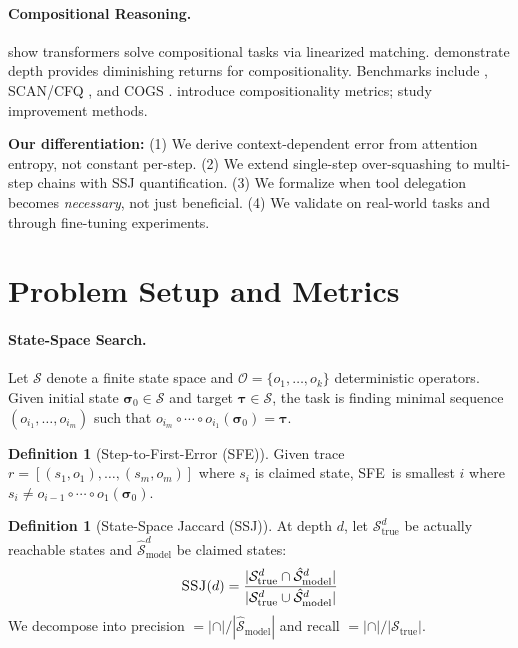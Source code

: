 \documentclass{article}
\theoremstyle{plain}
\theoremstyle{definition}
\newtheorem{definition}[theorem]{Definition}
\theoremstyle{remark}
\newcommand{\state}{\boldsymbol{\sigma}}
\newcommand{\target}{\boldsymbol{\tau}}
\newcommand{\ops}{\mathcal{O}}
\newcommand{\sfe}{\textsc{SFE}}
\newcommand{\ssj}{\textsc{SSJ}}
\begin{document}
\paragraph{Compositional Reasoning.} \citet{dziri2024faith} show transformers solve compositional tasks via linearized matching. \citet{petty2024depth} demonstrate depth provides diminishing returns for compositionality. Benchmarks include \citet{lake2018generalization}, SCAN/CFQ \citep{keysers2020measuring}, and COGS \citep{kim2020cogs}. \citet{press2023measuring} introduce compositionality metrics; \citet{ontanon2022making} study improvement methods.

\textbf{Our differentiation:} (1) We derive context-dependent error from attention entropy, not constant per-step. (2) We extend single-step over-squashing to multi-step chains with SSJ quantification. (3) We formalize when tool delegation becomes \emph{necessary}, not just beneficial. (4) We validate on real-world tasks and through fine-tuning experiments.


\section{Problem Setup and Metrics}
\label{sec:prelim}

\paragraph{State-Space Search.} Let $\mathcal{S}$ denote a finite state space and $\ops = \{o_1, \ldots, o_k\}$ deterministic operators. Given initial state $\state_0 \in \mathcal{S}$ and target $\target \in \mathcal{S}$, the task is finding minimal sequence $(o_{i_1}, \ldots, o_{i_m})$ such that $o_{i_m} \circ \cdots \circ o_{i_1}(\state_0) = \target$.

\begin{definition}[Step-to-First-Error (\sfe)]
Given trace $r = [(s_1, o_1), \ldots, (s_m, o_m)]$ where $s_i$ is claimed state, \sfe\ is smallest $i$ where $s_i \neq o_{i-1} \circ \cdots \circ o_1(\state_0)$.
\end{definition}

\begin{definition}[State-Space Jaccard (\ssj)]
\label{def:ssj}
At depth $d$, let $\mathcal{S}_\text{true}^d$ be actually reachable states and $\hat{\mathcal{S}}_\text{model}^d$ be claimed states:
\begin{equation}
\ssj(d) = \frac{|\mathcal{S}_\text{true}^d \cap \hat{\mathcal{S}}_\text{model}^d|}{|\mathcal{S}_\text{true}^d \cup \hat{\mathcal{S}}_\text{model}^d|}
\end{equation}
We decompose into precision $= |\cap|/|\hat{\mathcal{S}}_\text{model}|$ and recall $= |\cap|/|\mathcal{S}_\text{true}|$.
\end{definition}
\end{document}
